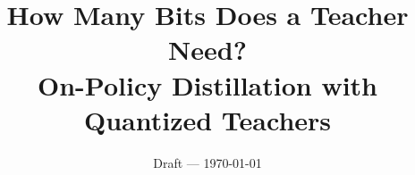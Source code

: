 \documentclass[11pt]{article}
\title{How Many Bits Does a Teacher Need?\\On-Policy Distillation with Quantized Teachers}
\author{\TBD}
\date{Draft --- \today}
\begin{document}
\maketitle

\begin{abstract}

\end{abstract}













\appendix

\end{document}
